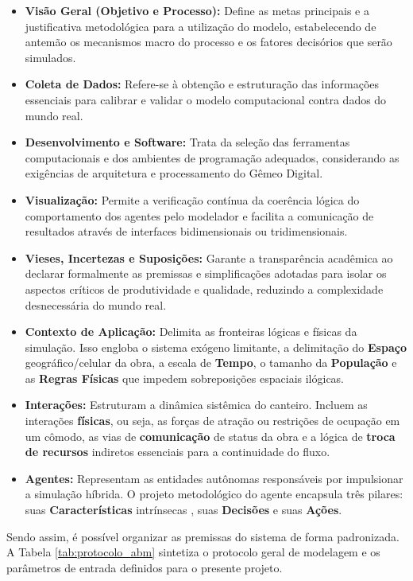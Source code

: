  \begin{itemize}
 	\item \textbf{Visão Geral (Objetivo e Processo):} Define as metas principais e a justificativa metodológica para a utilização do modelo, estabelecendo de antemão os mecanismos macro do processo e os fatores decisórios que serão simulados.
 	\item \textbf{Coleta de Dados:} Refere-se à obtenção e estruturação das informações essenciais para calibrar e validar o modelo computacional contra dados do mundo real.
 	\item \textbf{Desenvolvimento e Software:} Trata da seleção das ferramentas computacionais e dos ambientes de programação adequados, considerando as exigências de arquitetura e processamento do Gêmeo Digital.
 	\item \textbf{Visualização:} Permite a verificação contínua da coerência lógica do comportamento dos agentes pelo modelador e facilita a comunicação de resultados através de interfaces bidimensionais ou tridimensionais.
 	\item \textbf{Vieses, Incertezas e Suposições:} Garante a transparência acadêmica ao declarar formalmente as premissas e simplificações adotadas para isolar os aspectos críticos de produtividade e qualidade, reduzindo a complexidade desnecessária do mundo real.
 	\item \textbf{Contexto de Aplicação:} Delimita as fronteiras lógicas e físicas da simulação. Isso engloba o sistema exógeno limitante, a delimitação do \textbf{Espaço} geográfico/celular da obra, a escala de \textbf{Tempo}, o tamanho da \textbf{População} e as \textbf{Regras Físicas} que impedem sobreposições espaciais ilógicas.
 	\item \textbf{Interações:} Estruturam a dinâmica sistêmica do canteiro. Incluem as interações \textbf{físicas}, ou seja, as forças de atração ou restrições de ocupação em um cômodo, as vias de \textbf{comunicação} de status da obra e a lógica de \textbf{troca de recursos} indiretos essenciais para a continuidade do fluxo.
 	\item \textbf{Agentes:} Representam as entidades autônomas responsáveis por impulsionar a simulação híbrida. O projeto metodológico do agente encapsula três pilares: suas \textbf{Características} intrínsecas , suas \textbf{Decisões} e suas \textbf{Ações}.
 \end{itemize}
 Sendo assim, é possível organizar as premissas do sistema de forma padronizada. A Tabela \ref{tab:protocolo_abm} sintetiza o protocolo geral de modelagem e os parâmetros de entrada definidos para o presente projeto.
 
